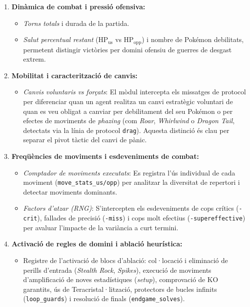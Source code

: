 \begin{enumerate}
    \item \textbf{Dinàmica de combat i pressió ofensiva:}
          \begin{itemize}
              \item \textit{Torns totals} i durada de la partida.
              \item \textit{Salut percentual restant} ($\text{HP}_{\mathrm{us}}$ vs $\text{HP}_{\mathrm{opp}}$) i nombre de Pokémon debilitats, permetent distingir victòries per domini ofensiu de guerres de desgast extrem.
          \end{itemize}

    \item \textbf{Mobilitat i caracterització de canvis:}
          \begin{itemize}
              \item \textit{Canvis voluntaris vs forçats}: El mòdul intercepta els missatges de protocol per diferenciar quan un agent realitza un canvi estratègic voluntari de quan es veu obligat a canviar per debilitament del seu Pokémon o per efectes de moviments de \textit{phazing} (com \textit{Roar}, \textit{Whirlwind} o \textit{Dragon Tail}, detectats via la línia de protocol \texttt{drag}). Aquesta distinció és clau per separar el pivot tàctic del canvi de pànic.
          \end{itemize}

    \item \textbf{Freqüències de moviments i esdeveniments de combat:}
          \begin{itemize}
              \item \textit{Comptador de moviments executats}: Es registra l'ús individual de cada moviment (\texttt{move\_stats\_us/opp}) per analitzar la diversitat de repertori i detectar moviments dominants.
              \item \textit{Factors d'atzar (RNG)}: S'intercepten els esdeveniments de cops crítics (\texttt{-crit}), fallades de precisió (\texttt{-miss}) i cops molt efectius (\texttt{-supereffective}) per avaluar l'impacte de la variància a curt termini.
          \end{itemize}

    \item \textbf{Activació de regles de domini i ablació heurística:}
          \begin{itemize}
              \item Registre de l'activació de blocs d'ablació: col·locació i eliminació de perills d'entrada (\textit{Stealth Rock}, \textit{Spikes}), execució de moviments d'amplificació de noves estadístiques (\textit{setup}), comprovació de KO garantits, ús de Teracristal·lització, protectors de bucles infinits (\texttt{loop\_guards}) i resolució de finals (\texttt{endgame\_solves}).
          \end{itemize}


\end{enumerate}
